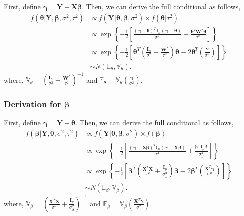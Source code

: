 \documentclass[12pt]{article} %
\theoremstyle{plain}
\theoremstyle{definition}
\theoremstyle{remark}
\begin{document}
First, define $\boldsymbol{\gamma}=\mathbf{Y}-\mathbf{X}\boldsymbol{\beta}$. Then, we can derive the full conditional as follows,
\begin{align*}
f\left(\boldsymbol{\theta}|\mathbf{Y},\boldsymbol{\beta},\sigma^2,\tau^2\right) &\propto f\left(\mathbf{Y}|\boldsymbol{\theta},\boldsymbol{\beta},\sigma^2\right) \times f(\boldsymbol{\theta}|\tau^2)\\
&\propto \exp\left\{-\frac{1}{2}\left[\frac{\left(\boldsymbol{\gamma}-\boldsymbol{\theta}\right)^T\mathbf{I}_n\left(\boldsymbol{\gamma}-\boldsymbol{\theta}\right)}{\sigma^2}+\frac{\boldsymbol{\theta}^T \mathbf{W}^*\boldsymbol{\theta}}{\tau^2} \right] \right\}\\
&\propto \exp\left\{-\frac{1}{2}\left[\boldsymbol{\theta}^T\left(\frac{\mathbf{I}_n}{\sigma^2}+\frac{\mathbf{W}^*}{\tau^2}\right)\boldsymbol{\theta}-2\boldsymbol{\theta}^T \left(\frac{ \boldsymbol{\gamma}}{\sigma^2}\right) \right] \right\}\\
&\sim N(\mathbb{E}_{\theta},\mathbb{V}_{\theta}).
\end{align*}
where, $\mathbb{V}_{\theta}=\left(\frac{\mathbf{I}_n}{\sigma^2}+\frac{\mathbf{W}^*}{\tau^2}\right)^{-1}$ and $\mathbb{E}_{\theta}=\mathbb{V}_{\theta}\left(\frac{ \boldsymbol{\gamma}}{\sigma^2}\right)$.\\

\subsubsection*{Derivation for $\boldsymbol{\beta}$}

First, define $\boldsymbol{\gamma}=\mathbf{Y}-\boldsymbol{\theta}$. Then, we can derive the full conditional as follows,
\begin{align*}
f\left(\boldsymbol{\beta}|\mathbf{Y},\boldsymbol{\theta},\sigma^2,\tau^2\right) &\propto f\left(\mathbf{Y}|\boldsymbol{\theta},\boldsymbol{\beta},\sigma^2\right) \times f(\boldsymbol{\beta})\\
&\propto \exp\left\{-\frac{1}{2}\left[\frac{\left(\boldsymbol{\gamma}-\mathbf{X}\boldsymbol{\beta}\right)^T\mathbf{I}_n\left(\boldsymbol{\gamma}-\mathbf{X}\boldsymbol{\beta}\right)}{\sigma^2}+\frac{\boldsymbol{\beta}^T \mathbf{I}_p\boldsymbol{\beta}}{\sigma_{\beta}^2} \right] \right\}\\
&\propto \exp\left\{-\frac{1}{2}\left[\boldsymbol{\beta}^T\left(\frac{\mathbf{X}^T\mathbf{X}}{\sigma^2}+\frac{\mathbf{I}_p}{\sigma_{\beta}^2}\right)\boldsymbol{\beta}-2\boldsymbol{\beta}^T \left(\frac{\mathbf{X}^T\boldsymbol{\gamma}}{\sigma^2}\right) \right] \right\}\\
&\sim N(\mathbb{E}_{\beta},\mathbb{V}_{\beta}).
\end{align*}
where, $\mathbb{V}_{\beta}=\left(\frac{\mathbf{X}^T\mathbf{X}}{\sigma^2}+\frac{\mathbf{I}_p}{\sigma_{\beta}^2}\right)^{-1}$ and $\mathbb{E}_{\beta}=\mathbb{V}_{\beta}\left(\frac{\mathbf{X}^T\boldsymbol{\gamma}}{\sigma^2}\right)$.\\
\end{document}
